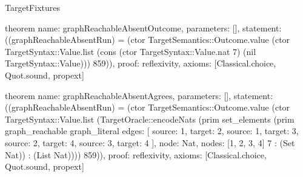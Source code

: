 \begin{lexlean}{TargetFixtures}
\begin{semanticmodule}
theorem{
  name: graphReachableAbsentOutcome,
  parameters: [],
  statement: ((graphReachableAbsentRun) = (ctor TargetSemantics::Outcome.value (ctor TargetSyntax::Value.list (cons (ctor TargetSyntax::Value.nat 7) (nil TargetSyntax::Value))) 859)),
  proof: reflexivity{},
  axioms: [Classical.choice, Quot.sound, propext]
}

theorem{
  name: graphReachableAbsentAgrees,
  parameters: [],
  statement: ((graphReachableAbsentRun) = (ctor TargetSemantics::Outcome.value (ctor TargetSyntax::Value.list (TargetOracle::encodeNats (prim set_elements (prim graph_reachable graph_literal{
    edges: [
      {source: 1, target: 2},
      {source: 1, target: 3},
      {source: 2, target: 4},
      {source: 3, target: 4}
    ],
    node: Nat,
    nodes: [1, 2, 3, 4]
  } 7 : (Set Nat)) : (List Nat)))) 859)),
  proof: reflexivity{},
  axioms: [Classical.choice, Quot.sound, propext]
}


\end{semanticmodule}
\end{lexlean}
